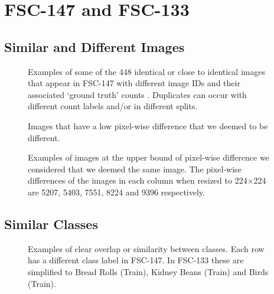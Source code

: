 \onecolumn
\appendices
\section{FSC-147 and FSC-133}
\subsection{Similar and Different Images}\label{similaranddifferent}
\begin{figure}[!ht]
    \centering
    \fontsize{9}{9}\selectfont
    
    \caption{Examples of some of the 448 identical or close to identical images that appear in FSC-147 with different image IDs and their associated `ground truth' counts . Duplicates can occur with different count labels and/or in different splits.}
    \label{subset_dupes}
\end{figure}

\begin{figure}[!ht]   
    \centering
    \fontsize{9}{9}\selectfont
    
    \caption{Images that have a low pixel-wise difference that we deemed to be different.}
    \label{no_similar}
\end{figure}
\begin{figure}[!ht]
    \centering
    \fontsize{9}{9}\selectfont
    
    \caption{Examples of images at the upper bound of pixel-wise difference we considered that we deemed the same image. The pixel-wise differences of the images in each column when resized to 224$\times$224 are 5207, 5403, 7551, 8224 and 9396 respectively.}
    \label{similar}
\end{figure}

\clearpage
\subsection{Similar Classes}\label{append_similar}
\begin{figure}[!ht]    
    \centering
    \fontsize{8}{8}\selectfont
    
    \caption{Examples of clear overlap or similarity between classes. Each row has a different class label in FSC-147. In FSC-133 these are simplified to Bread Rolls (Train), Kidney Beans (Train) and Birds (Train).}
    \label{arethesame}
\end{figure}


\clearpage

%     


